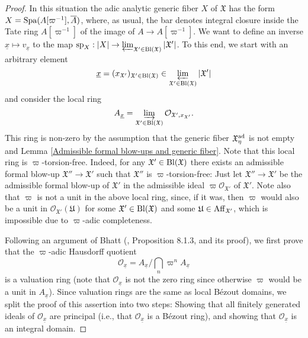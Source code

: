 \documentclass[12pt,twoside,a4paper]{article}
\theoremstyle{definition}
\theoremstyle{remark}
\newcommand\ad{{\rm ad}}
\newcommand\Aff{{\rm Aff}}
\newcommand\Bl{{\rm Bl}}
\newcommand\spc{{\rm sp}}
\newcommand\Spa{{\rm Spa}}
\begin{document}
\begin{proof}
In this situation the adic analytic generic fiber $X$ of $\mathfrak{X}$ has the form $X=\Spa(A[\varpi^{-1}], \overline{A})$, where, as usual, the bar denotes integral closure inside the Tate ring $A[\varpi^{-1}]$ of the image of $A\to A[\varpi^{-1}]$. We want to define an inverse $\underline{x}\mapsto v_{\underline{x}}$ to the map $\spc_{X}: \vert X\vert\to \varprojlim_{\mathfrak{X}'\in\Bl(\mathfrak{X})}\vert\mathfrak{X}'\vert$. To this end, we start with an arbitrary element \begin{equation*}\underline{x}=(x_{\mathfrak{X}'})_{\mathfrak{X}'\in\Bl(\mathfrak{X})}\in \varprojlim_{\mathfrak{X}'\in\Bl(\mathfrak{X})}\vert \mathfrak{X}'\vert \end{equation*}and consider the local ring \begin{equation*}A_{\underline{x}}=\varinjlim_{\mathfrak{X}'\in\Bl(\mathfrak{X})}\mathcal{O}_{\mathfrak{X}', x_{\mathfrak{X}'}}.\end{equation*}This ring is non-zero by the assumption that the generic fiber $\mathfrak{X}_{\eta}^{\ad}$ is not empty and Lemma \ref{Admissible formal blow-ups and generic fiber}. Note that this local ring is $\varpi$-torsion-free. Indeed, for any $\mathfrak{X}'\in\Bl(\mathfrak{X})$ there exists an admissible formal blow-up $\mathfrak{X}''\to \mathfrak{X}'$ such that $\mathfrak{X}''$ is $\varpi$-torsion-free: Just let $\mathfrak{X}''\to\mathfrak{X}'$ be the admissible formal blow-up of $\mathfrak{X}'$ in the admissible ideal $\varpi\mathcal{O}_{\mathfrak{X}'}$ of $\mathfrak{X}'$. Note also that $\varpi$ is not a unit in the above local ring, since, if it was, then $\varpi$ would also be a unit in $\mathcal{O}_{\mathfrak{X}'}(\mathfrak{U})$ for some $\mathfrak{X}'\in\Bl(\mathfrak{X})$ and some $\mathfrak{U}\in\Aff_{\mathfrak{X}'}$, which is impossible due to $\varpi$-adic completeness.   

Following an argument of Bhatt (\cite{Bhatt}, Proposition 8.1.3, and its proof), we first prove that the $\varpi$-adic Hausdorff quotient \begin{equation*}\mathcal{O}_{\underline{x}}=A_{\underline{x}}/\bigcap_{n}\varpi^{n}A_{\underline{x}}\end{equation*}is a valuation ring (note that $\mathcal{O}_{\underline{x}}$ is not the zero ring since otherwise $\varpi$ would be a unit in $A_{\underline{x}}$). Since valuation rings are the same as local Bézout domains, we split the proof of this assertion into two steps: Showing that all finitely generated ideals of $\mathcal{O}_{\underline{x}}$ are principal (i.e., that $\mathcal{O}_{\underline{x}}$ is a Bézout ring), and showing that $\mathcal{O}_{\underline{x}}$ is an integral domain. 


\end{proof}
\end{document}
